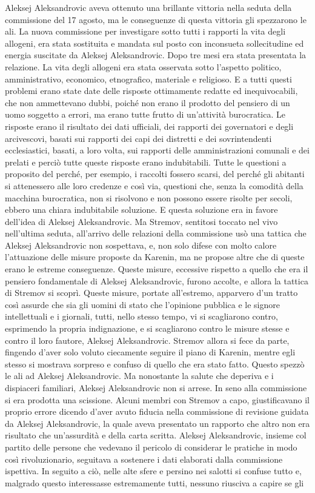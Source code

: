 Aleksej Aleksandrovic aveva ottenuto una brillante vittoria nella seduta della commissione del 17 agosto, ma le conseguenze di questa vittoria gli spezzarono le ali. La nuova commissione per investigare sotto tutti i rapporti la vita degli allogeni, era stata sostituita e mandata sul posto con inconsueta sollecitudine ed energia suscitate da Aleksej Aleksandrovic. Dopo tre mesi era stata presentata la relazione. La vita degli allogeni era stata osservata sotto l'aspetto politico, amministrativo, economico, etnografico, materiale e religioso. E a tutti questi problemi erano state date delle risposte ottimamente redatte ed inequivocabili, che non ammettevano dubbi, poiché non erano il prodotto del pensiero di un uomo soggetto a errori, ma erano tutte frutto di un'attività burocratica. Le risposte erano il risultato dei dati ufficiali, dei rapporti dei governatori e degli arcivescovi, basati sui rapporti dei capi dei distretti e dei sovrintendenti ecclesiastici, basati, a loro volta, sui rapporti delle amministrazioni comunali e dei prelati e perciò tutte queste risposte erano indubitabili. Tutte le questioni a proposito del perché, per esempio, i raccolti fossero scarsi, del perché gli abitanti si attenessero alle loro credenze e così via, questioni che, senza la comodità della macchina burocratica, non si risolvono e non possono essere risolte per secoli, ebbero una chiara indubitabile soluzione. E questa soluzione era in favore dell'idea di Aleksej Aleksandrovic. Ma Stremov, sentitosi toccato nel vivo nell'ultima seduta, all'arrivo delle relazioni della commissione usò una tattica che Aleksej Aleksandrovic non sospettava, e, non solo difese con molto calore l'attuazione delle misure proposte da Karenin, ma ne propose altre che di queste erano le estreme conseguenze. Queste misure, eccessive rispetto a quello che era il pensiero fondamentale di Aleksej Aleksandrovic, furono accolte, e allora la tattica di Stremov si scoprì. Queste misure, portate all'estremo, apparvero d'un tratto così assurde che sia gli uomini di stato che l'opinione pubblica e le signore intellettuali e i giornali, tutti, nello stesso tempo, vi si scagliarono contro, esprimendo la propria indignazione, e si scagliarono contro le misure stesse e contro il loro fautore, Aleksej Aleksandrovic. Stremov allora si fece da parte, fingendo d'aver solo voluto ciecamente seguire il piano di Karenin, mentre egli stesso si mostrava sorpreso e confuso di quello che era stato fatto. Questo spezzò le ali ad Aleksej Aleksandrovic. Ma nonostante la salute che deperiva e i dispiaceri familiari, Aleksej Aleksandrovic non si arrese. In seno alla commissione si era prodotta una scissione. Alcuni membri con Stremov a capo, giustificavano il proprio errore dicendo d'aver avuto fiducia nella commissione di revisione guidata da Aleksej Aleksandrovic, la quale aveva presentato un rapporto che altro non era risultato che un'assurdità e della carta scritta. Aleksej Aleksandrovic, insieme col partito delle persone che vedevano il pericolo di considerar le pratiche in modo così rivoluzionario, seguitava a sostenere i dati elaborati dalla commissione ispettiva. In seguito a ciò, nelle alte sfere e persino nei salotti si confuse tutto e, malgrado questo interessasse estremamente tutti, nessuno riusciva a capire se gli 